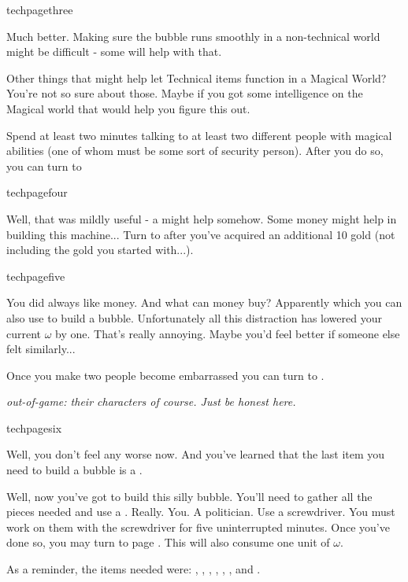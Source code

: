 \documentclass[greennotebook]{guildcamp3} %
\begin{document}
\begin{page}[good...]{techpagethree}
	
Much better. Making sure the bubble runs smoothly in a non-technical world might be difficult - some \iGraphiteLube{} will help with that. 

Other things that might help let Technical items function in a Magical World? You're not so sure about those. Maybe if you got some intelligence on the Magical world that would help you figure this out. 

Spend at least two minutes talking to at least two different people with magical abilities (one of whom must be some sort of security person). After you do so, you can turn to 

\end{page}

\begin{page}{techpagefour}
	
Well, that was mildly useful - a \iFlashlight{} might help somehow. Some money might help in building this machine... Turn to  after you've acquired an additional 10 gold (not including the gold you started with...).
	
\end{page}

\begin{page}{techpagefive}

You did always like money. And what can money buy? Apparently \iNiobiumCarbide{} which you can also use to build a bubble. Unfortunately all this distraction has lowered your current $\omega$ by one. That's really annoying. Maybe you'd feel better if someone else felt similarly...

Once you make two people become embarrassed you can turn to  .

\emph{out-of-game: their characters of course. Just be honest here.}
	
\end{page}

\begin{page}{techpagesix}
	
Well, you don't feel any worse now. And you've learned that the last item you need to build a bubble is a \iTransistor{}. 

Well, now you've got to build this silly bubble. You'll need to gather all the pieces needed and use a \iScrewdriver{}. Really. You. A politician. Use a screwdriver. You must work on them with the screwdriver for five uninterrupted minutes. Once you've done so, you may turn to page . This will also consume one unit of $\omega$.

As a reminder, the items needed were: \iScrapMetal{}, \iCircuitBoard{}, \iCog{}, \iGraphiteLube{}, \iFlashlight{}, \iNiobiumCarbide{}, and \iTransistor{}. 
	
\end{page}	
\end{document}
